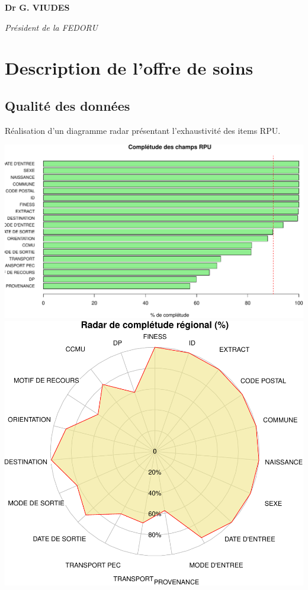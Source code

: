 \documentclass[]{article}
\begin{document}
\textbf{Dr G. VIUDES}

\emph{Président de la FEDORU}

\section{Description de l'offre de
soins}\label{description-de-loffre-de-soins}

\subsection{Qualité des données}\label{qualite-des-donnees}

Réalisation d'un diagramme radar présentant l'exhaustivité des items
RPU.

\includegraphics{rapport2014_V4_files/figure-latex/completude-1.pdf}
\includegraphics{rapport2014_V4_files/figure-latex/completude-2.pdf}
\end{document}
